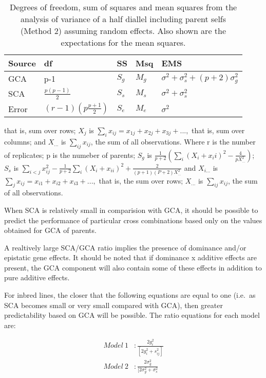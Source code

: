 \documentclass[nofonts,]{tufte-handout}
\begin{document}
\begin{table}

\caption{\label{tab:half-diallel-random}Degrees of freedom, sum of squares and mean squares from the analysis of variance of a half diallel including parent selfs (Method 2) assuming random effects. Also shown are the expectations for the mean squares.}
\centering
\begin{tabular}[t]{lllll}
\toprule
Source & df & SS & Msq & EMS\\
\midrule
GCA & p-1 & $S_g$ & $M_g$ & $\sigma^2 + \sigma^2_s + (p+2)\sigma^2_g$\\
SCA & $\frac{p(p-1)}{2}$ & $S_s$ & $M_s$ & $\sigma^2 + \sigma_s^2$\\
Error & $(r-1)\left(p\frac{p+1}{2}\right)$ & $S_e$ & $M_e$ & $\sigma^2$\\
\bottomrule
\end{tabular}
\end{table}

that is, sum over rows; \(X_j\) is
\(\sum_ix_{ij} = x_{1j} + x_{2j} + x_{3j} + ...,\) that is, sum over
columns; and \(X_{...}\) is \(\sum_{ij}x_{ij}\), the sum of all
observations. Where r is the number of replicates; p is the numeber of
parents; \(S_g\) is
\(\frac{1}{p+2}(\sum_i(X_i + x_ii)^2-\frac{4}{pX_{...}^2})\); \(S_s\) is
\(\sum_{i<j}x_{ij}^2-\frac{1}{p+2}\sum_i(X_i + x_{ii})^2 + \frac{2}{(p+1)(P+2)X_{...}^2}\)
and \(X_{i...}\) is \(\sum_j x_{ij} = x_{i1} + x_{i2} + x_{i3} + ...,\)
that is, the sum over rows; \(X_{...}\) is \(\sum_{ij}x_{ij}\), the sum
of all observations.

When SCA is relatively small in comparision with GCA, it should be
possible to predict the performance of particular cross combinations
based only on the values obtained for GCA of parents.

A realtively large SCA/GCA ratio implies the presence of dominance
and/or epistatic gene effects. It should be noted that if dominance x
additive effects are present, the GCA component will also contain some
of these effects in addition to pure additive effects.

For inbred lines, the closer that the following equations are equal to
one (i.e.~as SCA becomes small or very small compared with GCA), then
greater predictability based on GCA will be possible. The ratio
equations for each model are:

\[
\begin{aligned}
Model~1 &: \frac{2g_i^2}{[2g_i^2 + s_{ij}^2]} \\
Model~2 &: \frac{2\sigma_g^2}{[2\sigma_g^2 + \sigma_s^2}
\end{aligned}
\]
\end{document}
